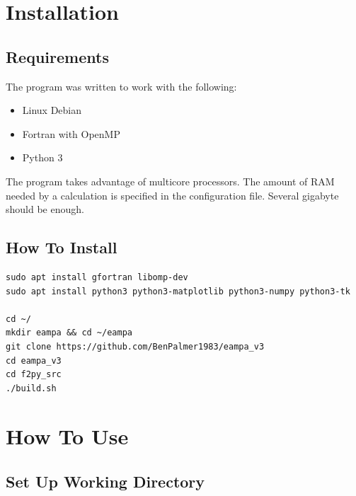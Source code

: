 \documentclass[12pt,twoside]{manual}
\begin{document}


\chapter{Installation}

\section{Requirements}

The program was written to work with the following:

\begin{itemize}
\item Linux Debian
\item Fortran with OpenMP
\item Python 3
\end{itemize}


The program takes advantage of multicore processors.  The amount of RAM needed by a calculation is specified in the configuration file.  Several gigabyte should be enough.



\section{How To Install}

\begin{lstlisting}
sudo apt install gfortran libomp-dev
sudo apt install python3 python3-matplotlib python3-numpy python3-tk

cd ~/
mkdir eampa && cd ~/eampa
git clone https://github.com/BenPalmer1983/eampa_v3
cd eampa_v3
cd f2py_src
./build.sh
\end{lstlisting}








\chapter{How To Use}


\section{Set Up Working Directory}
\end{document}
